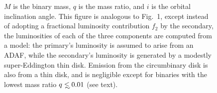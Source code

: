 

\begin{figure}
\begin{center}
\end{center}
\caption{
  $M$ is the binary mass, $q$ is
the mass ratio, and $i$ is the orbital inclination angle. This figure
is analogous to Fig.~1, except instead of adopting a fractional
luminosity contribution $f_2$ by the secondary, the luminosities of
each of the three components are computed from a model: the primary's
luminosity is assumed to arise from an ADAF, while the secondary's
luminosity is generated by a modestly super-Eddington thin
disk. Emission from the circumbinary disk is also from a thin disk,
and is negligible except for binaries with the lowest mass ratio
$q\lsim 0.01$ (see text).
}
\label{Fig:AllowedBeam}
\end{figure}


